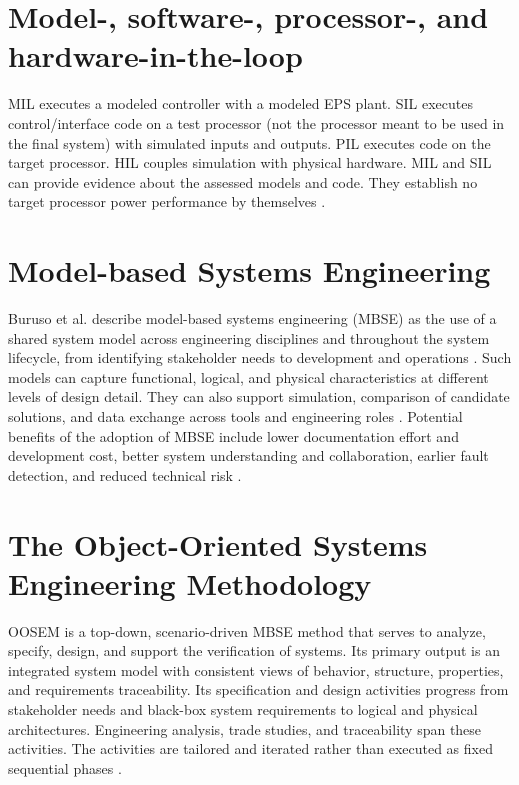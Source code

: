 \section{Model-, software-, processor-, and hardware-in-the-loop}

MIL executes a modeled controller with a modeled EPS plant. SIL executes control/interface code on a test processor (not the processor meant to be used in the final system) with simulated inputs and outputs. PIL executes code on the target processor. HIL couples simulation with physical hardware. MIL and SIL can provide evidence about the assessed models and code. They establish no target processor power performance by themselves \citep{handpicked-0001,review-0573}.

\section{Model-based Systems Engineering}
Buruso et al. describe model-based systems engineering (MBSE) as the use of a shared system model across engineering disciplines and throughout the system lifecycle, from identifying stakeholder needs to development and operations \cite{buruso2026modelbased}.
Such models can capture functional, logical, and physical characteristics at different levels of design detail.
They can also support simulation, comparison of candidate solutions, and data exchange across tools and engineering roles \cite{buruso2026modelbased}.
Potential benefits of the adoption of MBSE include lower documentation effort and development cost, better system understanding and collaboration, earlier fault detection, and reduced technical risk \cite{buruso2026modelbased}.

\section{The Object-Oriented Systems Engineering Methodology}
OOSEM is a top-down, scenario-driven MBSE method that serves to analyze, specify, design, and support the verification of systems. Its primary output is an integrated system model with consistent views of behavior, structure, properties, and requirements traceability. Its specification and design activities progress from stakeholder needs and black-box system requirements to logical and physical architectures. Engineering analysis, trade studies, and traceability span these activities. The activities are tailored and iterated rather than executed as fixed sequential phases \citep{friedenthal2014practical}.

